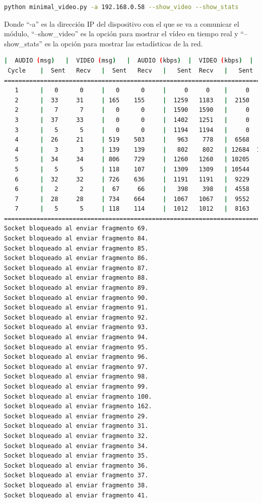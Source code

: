 \begin{lstlisting}[language=bash]
python minimal_video.py -a 192.168.0.58 --show_video --show_stats
\end{lstlisting}
Donde ``-a'' es la dirección IP del dispositivo con el que se va a comunicar el módulo, ``--show\_video'' es la opción para mostrar el vídeo en tiempo real y ``--show\_stats'' es la opción para mostrar las estadísticas de la red.
\vspace{\baselineskip}

\begin{lstlisting}[language=bash,basicstyle=\ttfamily\scriptsize]
          |  AUDIO (msg)   |  VIDEO (msg)   |  AUDIO (kbps)  |  VIDEO (kbps)  |   CPU (%)
 Cycle    |  Sent   Recv   |  Sent   Recv   |   Sent  Recv   |   Sent  Recv   | Program System
============================================================================================
   1      |   0      0     |   0      0     |     0     0    |     0     0    |   0      0
   2      |  33     31     | 165    155     |  1259   1183   |  2150   2022   |  25     68
   2      |   7      7     |   0      0     |  1590   1590   |     0      0   |  13     71
   3      |  37     33     |   0      0     |  1402   1251   |     0      0   |  30     73
   3      |   5      5     |   0      0     |  1194   1194   |     0      0   |  21     73
   4      |  26     21     | 519    503     |   963    778   |  6568   6365   |  39     76
   4      |   3      3     | 139    139     |   802    802   | 12684  12702   |  24     78
   5      |  34     34     | 806    729     |  1260   1260   | 10205   9226   |  45     76
   5      |   5      5     | 118    107     |  1309   1309   | 10544   9576   |  31     74
   6      |  32     32     | 726    636     |  1191   1191   |  9229   8088   |  32     73
   6      |   2      2     |  67     66     |   398    398   |  4558   4477   |   6     74
   7      |  28     28     | 734    664     |  1067   1067   |  9552   8645   |  33     76
   7      |   5      5     | 118    114     |  1012   1012   |  8163   7887   |  24     76
============================================================================================
Socket bloqueado al enviar fragmento 69.
Socket bloqueado al enviar fragmento 84.
Socket bloqueado al enviar fragmento 85.
Socket bloqueado al enviar fragmento 86.
Socket bloqueado al enviar fragmento 87.
Socket bloqueado al enviar fragmento 88.
Socket bloqueado al enviar fragmento 89.
Socket bloqueado al enviar fragmento 90.
Socket bloqueado al enviar fragmento 91.
Socket bloqueado al enviar fragmento 92.
Socket bloqueado al enviar fragmento 93.
Socket bloqueado al enviar fragmento 94.
Socket bloqueado al enviar fragmento 95.
Socket bloqueado al enviar fragmento 96.
Socket bloqueado al enviar fragmento 97.
Socket bloqueado al enviar fragmento 98.
Socket bloqueado al enviar fragmento 99.
Socket bloqueado al enviar fragmento 100.
Socket bloqueado al enviar fragmento 162.
Socket bloqueado al enviar fragmento 29.
Socket bloqueado al enviar fragmento 31.
Socket bloqueado al enviar fragmento 32.
Socket bloqueado al enviar fragmento 34.
Socket bloqueado al enviar fragmento 35.
Socket bloqueado al enviar fragmento 36.
Socket bloqueado al enviar fragmento 37.
Socket bloqueado al enviar fragmento 38.
Socket bloqueado al enviar fragmento 41.


\end{lstlisting}

